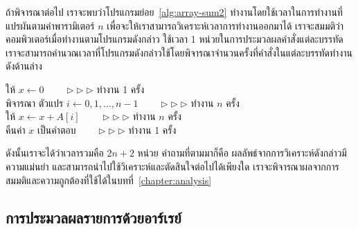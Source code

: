 ถ้า{\wbr}พิจารณา{\wbr}ต่อ{\wbr}ไป เรา{\wbr}จะ{\wbr}พบ{\wbr}ว่า{\wbr}โปรแกรม{\wbr}ย่อย~\ref{alg:array-sum2}
ทำงาน{\wbr}โดย{\wbr}ใช้{\wbr}เวลา{\wbr}ใน{\wbr}การ{\wbr}ทำงาน{\wbr}ที่{\wbr}แปรผัน{\wbr}ตาม{\wbr}ค่า{\wbr}พารามิเตอร์ $n$
เพื่อ{\wbr}จะ{\wbr}ให้{\wbr}เรา{\wbr}สามารถ{\wbr}วิเคราะห์{\wbr}เวลา{\wbr}การ{\wbr}ทำงาน{\wbr}ออก{\wbr}มา{\wbr}ได้{\wbr}
เรา{\wbr}จะ{\wbr}สมมติ{\wbr}ว่า{\wbr}คอมพิวเตอร์{\wbr}เมื่อ{\wbr}ทำงาน{\wbr}ตาม{\wbr}โปรแกรม{\wbr}ดัง{\wbr}กล่าว ใช้{\wbr}เวลา 1
หน่วย{\wbr}ใน{\wbr}การ{\wbr}ประมวล{\wbr}ผล{\wbr}คำ{\wbr}สั่ง{\wbr}แต่ละ{\wbr}บรรทัด{\wbr}
เรา{\wbr}จะ{\wbr}สามารถ{\wbr}คำนวณ{\wbr}เวลา{\wbr}ที่{\wbr}โปรแกรม{\wbr}ดัง{\wbr}กล่าว{\wbr}ใช้{\wbr}โดย{\wbr}พิจารณา{\wbr}จำนวน{\wbr}ครั้ง{\wbr}ที่{\wbr}คำ{\wbr}สั่ง{\wbr}ใน{\wbr}แต่ละ{\wbr}บรรทัด{\wbr}ทำงาน{\wbr}
ดัง{\wbr}ด้าน{\wbr}ล่าง{\wbr}

\begin{algt}
\noindent \hspace*{0.2in} ให้ $x\leftarrow 0$   \ \ \ \ $\rhd\rhd\rhd$ ทำงาน 1 ครั้ง\\
\hspace*{0.2in} พิจารณา ตัวแปร $i\leftarrow 0,1,\ldots,n-1$  \ \ \ \ $\rhd\rhd\rhd$ ทำงาน $n$ ครั้ง\\
\hspace*{0.2in}\hspace*{0.2in} ให้ $x \leftarrow x + A[i]$  \ \ \ \ $\rhd\rhd\rhd$ ทำงาน $n$ ครั้ง\\
\hspace*{0.2in} คืน{\wbr}ค่า $x$ เป็น{\wbr}คำ{\wbr}ตอบ  \ \ \ \ $\rhd\rhd\rhd$ ทำงาน 1 ครั้ง{\wbr}
\end{algt}

ดังนั้น{\wbr}เรา{\wbr}จะ{\wbr}ได้{\wbr}ว่า{\wbr}เวลา{\wbr}รวม{\wbr}คือ $2n + 2$ หน่วย คำ{\wbr}ถาม{\wbr}ที่{\wbr}ตาม{\wbr}มา{\wbr}ก็{\wbr}คือ{\wbr}
ผลลัพธ์{\wbr}จาก{\wbr}การ{\wbr}วิเคราะห์{\wbr}ดัง{\wbr}กล่าว{\wbr}มี{\wbr}ความ{\wbr}แม่นยำ{\wbr}
และ{\wbr}สามารถ{\wbr}นำ{\wbr}ไป{\wbr}ใช้{\wbr}วิเคราะห์{\wbr}และ{\wbr}ตัดสิน{\wbr}ใจ{\wbr}ต่อ{\wbr}ไป{\wbr}ได้{\wbr}เพียง{\wbr}ใด{\wbr}
เรา{\wbr}จะ{\wbr}พิจารณา{\wbr}ผล{\wbr}จาก{\wbr}การ{\wbr}สมมติ{\wbr}และ{\wbr}ความ{\wbr}ถูกต้อง{\wbr}ที่{\wbr}ใช้{\wbr}ได้{\wbr}ใน{\wbr}บท{\wbr}ที่~\ref{chapter:analysis}

\subsection{การ{\wbr}ประมวล{\wbr}ผล{\wbr}รายการ{\wbr}ด้วย{\wbr}อาร์{\wbr}เรย์}
\label{sect:array-list-processing}

